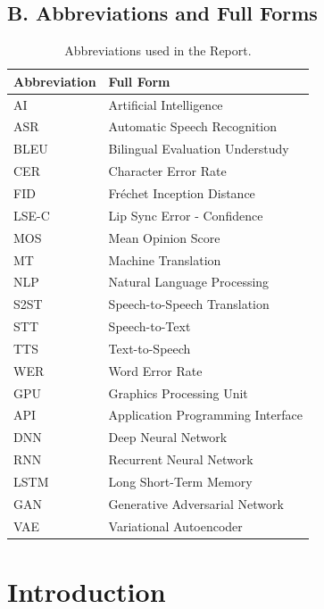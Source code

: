 \documentclass[12pt,oneside]{report}
\begin{document}
\newpage
\section*{B. Abbreviations and Full Forms}

\begin{table}[H]
\centering
\caption{Abbreviations used in the Report.}
\label{tab:abbrev}
\renewcommand{\arraystretch}{1.05}
\setlength{\tabcolsep}{4.5pt}
\small
\begin{tabular}{@{}ll@{}}
\toprule
\textbf{Abbreviation} & \textbf{Full Form} \\
\midrule
AI & Artificial Intelligence \\
ASR & Automatic Speech Recognition \\
BLEU & Bilingual Evaluation Understudy \\
CER & Character Error Rate \\
FID & Fréchet Inception Distance \\
LSE-C & Lip Sync Error - Confidence \\
MOS & Mean Opinion Score \\
MT & Machine Translation \\
NLP & Natural Language Processing \\
S2ST & Speech-to-Speech Translation \\
STT & Speech-to-Text \\
TTS & Text-to-Speech \\
WER & Word Error Rate \\
GPU & Graphics Processing Unit \\
API & Application Programming Interface \\
DNN & Deep Neural Network \\
RNN & Recurrent Neural Network \\
LSTM & Long Short-Term Memory \\
GAN & Generative Adversarial Network \\
VAE & Variational Autoencoder \\
\bottomrule
\end{tabular}
\end{table}



\chapter{Introduction}
\label{ch:intro}
\end{document}
